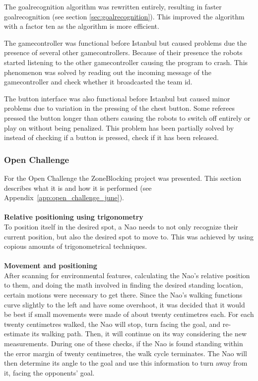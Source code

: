 \documentclass[11pt,a4paper,oneside]{article}
\begin{document}
The goalrecognition algorithm was rewritten entirely, resulting in faster goalrecognition (see section \ref{sec:goalrecognition}). This improved the algorithm with a factor ten as the algorithm is more efficient.

The gamecontroller was functional before Istanbul but caused problems due the presence of several other gamecontrollers. Because of their presence the robots started listening to the other gamecontroller causing the program to crash. This phenomenon was solved by reading out the incoming message of the gamecontroller and check whether it broadcasted the team id.

The button interface was also functional before Istanbul but caused minor problems due to variation in the pressing of the chest button. Some referees pressed the button longer than others causing the robots to switch off entirely or play on without being penalized. This problem has been partially solved by instead of checking if a button is pressed, check if it has been released.

\subsubsection{Open Challenge}
\label{sec:zoneblocking}

For the Open Challenge the ZoneBlocking project was presented. This section describes what it is and how it is performed (see Appendix~\ref{app:open_challenge_june}).\\\\
{\bf Relative positioning using trigonometry}\\
To position itself in the desired spot, a Nao needs to not only recognize their current position, but also the desired spot to move to. This was achieved by using copious amounts of trigonometrical techniques.\\\\
{\bf Movement and positioning}\\
After scanning for environmental features, calculating the Nao's relative position to them, and doing the math involved in finding the desired standing location, certain motions were necessary to get there. Since the Nao's walking functions curve slightly to the left and have some overshoot, it was decided that it would be best if small movements were made of about twenty centimetres each. For each twenty centimetres walked, the Nao will stop, turn facing the goal, and re-estimate its walking path. Then, it will continue on its way considering the new measurements. During one of these checks, if the Nao is found standing within the error margin of twenty centimetres, the walk cycle terminates. The Nao will then determine its angle to the goal and use this information to turn away from it, facing the opponents' goal.
\end{document}
